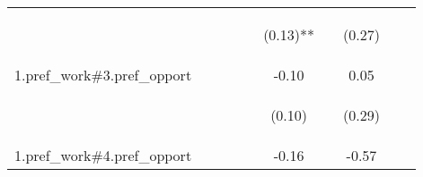 \begin{center}
\begin{tabular}{lccccccccc}
 & \begin{footnotesize}\end{footnotesize} & \begin{footnotesize}\end{footnotesize} & \begin{footnotesize}\end{footnotesize} & \begin{footnotesize}\end{footnotesize} & \begin{footnotesize}(0.13)**\end{footnotesize} & \begin{footnotesize}\end{footnotesize} & \begin{footnotesize}(0.27)\end{footnotesize} & \begin{footnotesize}\end{footnotesize} & \begin{footnotesize}\end{footnotesize}\\
\noalign{\smallskip}1.pref_work\#3.pref_opport &  &  &  &  & -0.10 &  & 0.05 &  & \\
 & \begin{footnotesize}\end{footnotesize} & \begin{footnotesize}\end{footnotesize} & \begin{footnotesize}\end{footnotesize} & \begin{footnotesize}\end{footnotesize} & \begin{footnotesize}(0.10)\end{footnotesize} & \begin{footnotesize}\end{footnotesize} & \begin{footnotesize}(0.29)\end{footnotesize} & \begin{footnotesize}\end{footnotesize} & \begin{footnotesize}\end{footnotesize}\\
\noalign{\smallskip}1.pref_work\#4.pref_opport &  &  &  &  & -0.16 &  & -0.57 &  & \\

\end{tabular}
\end{center}
